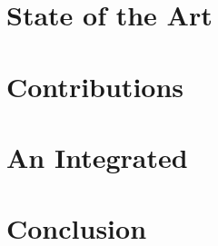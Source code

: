 \documentclass[ twoside,openright,titlepage,numbers=noenddot,headinclude,%
                beramono,eulermath,parts,pdfspacing,subfig,%
                footinclude=true,cleardoublepage=empty,abstractoff,%
                BCOR=5mm,paper=a4,fontsize=10pt,%
                british,%
                ]{scrreprt}
\begin{document}



 \setcounter{page}{1}
\pagestyle{empty}





\clearpage

\pagestyle{plain}

\raggedbottom

\tableofcontents

\cleardoublepage

\ifdraft{}{}

\pagestyle{fancy}
 \setcounter{page}{1}




\part{State of the Art}
\label{part:state-art}





\part{Contributions}
\label{part:contributions}







\part{An Integrated \Usecase{}}
\label{part:usecase}




\part{Conclusion}
\label{part:conclusion}





\printbibliography
\end{document}
